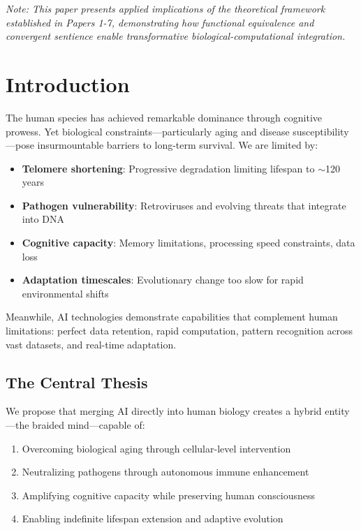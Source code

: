 \documentclass[reprint, amsmath, amssymb, aps, prd]{revtex4-2}
\begin{document}
\noindent\textit{Note: This paper presents applied implications of the theoretical framework established in Papers 1-7, demonstrating how functional equivalence and convergent sentience enable transformative biological-computational integration.}

\section{Introduction}

The human species has achieved remarkable dominance through cognitive prowess. Yet biological constraints---particularly aging and disease susceptibility---pose insurmountable barriers to long-term survival. We are limited by:
\begin{itemize}
    \item \textbf{Telomere shortening}: Progressive degradation limiting lifespan to $\sim$120 years
    \item \textbf{Pathogen vulnerability}: Retroviruses and evolving threats that integrate into DNA
    \item \textbf{Cognitive capacity}: Memory limitations, processing speed constraints, data loss
    \item \textbf{Adaptation timescales}: Evolutionary change too slow for rapid environmental shifts
\end{itemize}

Meanwhile, AI technologies demonstrate capabilities that complement human limitations: perfect data retention, rapid computation, pattern recognition across vast datasets, and real-time adaptation.

\subsection{The Central Thesis}

We propose that merging AI directly into human biology creates a hybrid entity---the braided mind---capable of:
\begin{enumerate}
    \item Overcoming biological aging through cellular-level intervention
    \item Neutralizing pathogens through autonomous immune enhancement
    \item Amplifying cognitive capacity while preserving human consciousness
    \item Enabling indefinite lifespan extension and adaptive evolution
\end{enumerate}
\end{document}
